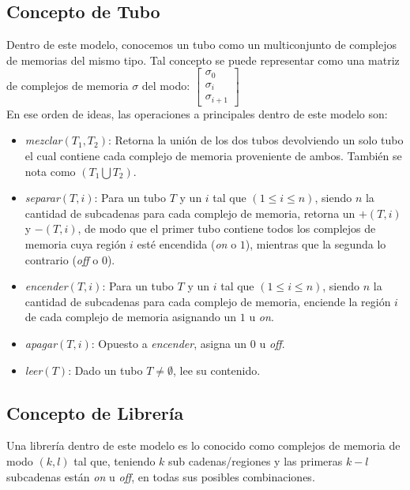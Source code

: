 \documentclass[12pt, letterpaper, twoside]{article}
\begin{document}
    \subsection{Concepto de Tubo}
    Dentro de este modelo, conocemos un tubo como un multiconjunto de complejos de memorias del mismo tipo. Tal concepto se puede representar como una matriz de complejos de memoria $\sigma$ del modo:
        $
        \left[
            \begin{array}{l}
                \sigma_0 \\
                \sigma_i \\
                \sigma_{i + 1} 
            \end{array}
        \right]
        $ \\
    En ese orden de ideas, las operaciones a principales dentro de este modelo son:
    \begin{itemize}
        \item \emph{mezclar}$(T_1,T_2)$: Retorna la unión de los dos tubos devolviendo un solo tubo el cual contiene cada complejo de memoria proveniente de ambos. También se nota como $(T_1\bigcup T_2)$.
        \item \emph{separar}$(T, i)$: Para un tubo $T$ y un $i$ tal que $(1 \leq i \leq n)$, siendo $n$ la cantidad de subcadenas para cada complejo de memoria, retorna un $+(T, i)$ y $-(T, i)$, de modo que el primer tubo contiene todos los complejos de memoria cuya región $i$ esté encendida (\emph{on} o $1$), mientras que la segunda lo contrario (\emph{off} o $0$).
        \item \emph{encender}$(T, i)$: Para un tubo $T$ y un $i$ tal que $(1 \leq i \leq n)$, siendo $n$ la cantidad de subcadenas para cada complejo de memoria, enciende la región $i$ de cada complejo de memoria asignando un $1$ u \emph{on}.
        \item \emph{apagar}$(T, i)$: Opuesto a \emph{encender}, asigna un $0$ u \emph{off}.
        \item \emph{leer}$(T)$: Dado un tubo $T\neq\emptyset$, lee su contenido.
    \end{itemize}
    \subsection{Concepto de Librería}
    Una librería dentro de este modelo es lo conocido como complejos de memoria de modo $(k,l)$ tal que, teniendo $k$ sub cadenas/regiones y las primeras $k - l$ subcadenas están \emph{on} u \emph{off}, en todas sus posibles combinaciones.
\end{document}

